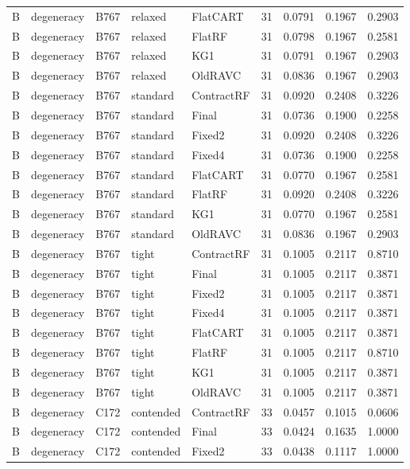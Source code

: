 \begin{longtable}{@{}lllllllll@{}}
B & degeneracy & B767 & relaxed & FlatCART & 31 & 0.0791 & 0.1967 & 0.2903\\
B & degeneracy & B767 & relaxed & FlatRF & 31 & 0.0798 & 0.1967 & 0.2581\\
B & degeneracy & B767 & relaxed & KG1 & 31 & 0.0791 & 0.1967 & 0.2903\\
B & degeneracy & B767 & relaxed & OldRAVC & 31 & 0.0836 & 0.1967 & 0.2903\\
B & degeneracy & B767 & standard & ContractRF & 31 & 0.0920 & 0.2408 & 0.3226\\
B & degeneracy & B767 & standard & Final & 31 & 0.0736 & 0.1900 & 0.2258\\
B & degeneracy & B767 & standard & Fixed2 & 31 & 0.0920 & 0.2408 & 0.3226\\
B & degeneracy & B767 & standard & Fixed4 & 31 & 0.0736 & 0.1900 & 0.2258\\
B & degeneracy & B767 & standard & FlatCART & 31 & 0.0770 & 0.1967 & 0.2581\\
B & degeneracy & B767 & standard & FlatRF & 31 & 0.0920 & 0.2408 & 0.3226\\
B & degeneracy & B767 & standard & KG1 & 31 & 0.0770 & 0.1967 & 0.2581\\
B & degeneracy & B767 & standard & OldRAVC & 31 & 0.0836 & 0.1967 & 0.2903\\
B & degeneracy & B767 & tight & ContractRF & 31 & 0.1005 & 0.2117 & 0.8710\\
B & degeneracy & B767 & tight & Final & 31 & 0.1005 & 0.2117 & 0.3871\\
B & degeneracy & B767 & tight & Fixed2 & 31 & 0.1005 & 0.2117 & 0.3871\\
B & degeneracy & B767 & tight & Fixed4 & 31 & 0.1005 & 0.2117 & 0.3871\\
B & degeneracy & B767 & tight & FlatCART & 31 & 0.1005 & 0.2117 & 0.3871\\
B & degeneracy & B767 & tight & FlatRF & 31 & 0.1005 & 0.2117 & 0.8710\\
B & degeneracy & B767 & tight & KG1 & 31 & 0.1005 & 0.2117 & 0.3871\\
B & degeneracy & B767 & tight & OldRAVC & 31 & 0.1005 & 0.2117 & 0.3871\\
B & degeneracy & C172 & contended & ContractRF & 33 & 0.0457 & 0.1015 & 0.0606\\
B & degeneracy & C172 & contended & Final & 33 & 0.0424 & 0.1635 & 1.0000\\
B & degeneracy & C172 & contended & Fixed2 & 33 & 0.0438 & 0.1117 & 1.0000\\

\end{longtable}
